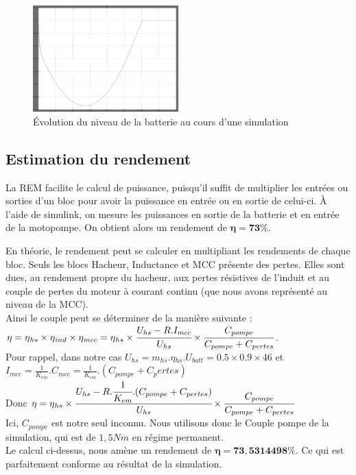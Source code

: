 \begin{figure}[ht]
	\begin{center}
	\includegraphics[width=0.5\textwidth]{images/Niveau_batt_inv.png}
	\caption{Évolution du niveau de la batterie au cours d'une simulation}\label{img:NivBatt}
	\end{center}
\end{figure}
\FloatBarrier 


\subsection{Estimation du rendement}
La REM facilite le calcul de puissance, puisqu'il suffit de multiplier les entrées ou sorties d'un bloc pour avoir la puissance en entrée ou en  sortie de celui-ci. À l'aide de simulink, on mesure les puissances en sortie de la batterie et en entrée de la motopompe. On obtient alors un rendement de $\mathbf{\eta = 73 \%}$.

En théorie, le rendement peut se calculer en multipliant les rendements de chaque bloc. Seuls les blocs Hacheur, Inductance et MCC présente des pertes. Elles sont dues, au rendement propre du hacheur, aux pertes résistives de l'induit et au couple de pertes du moteur à courant continu (que nous avons représenté au niveau de la MCC).\\
Ainsi le couple peut se déterminer de la manière suivante : \\
$\eta = \eta{}_{hs} \times \eta{}_{ind} \times \eta{}_{mcc} = \eta{}_{hs} \times \cfrac{U_{hs}-R.I_{mcc}}{U_{hs}} \times \cfrac{C_{pompe}}{C_{pompe}+C_{pertes}}$.\\
Pour rappel, dans notre cas $ U_{hs} = m_{hs}.\eta{}_{hs}.U_{batt} = 0.5\times0.9\times46 $ et $ I_{mcc} = \frac{1}{K_{em}}.C_{mcc} = \frac{1}{K_{em}}.(C_{pompe}+C_pertes)$\\
Donc $\eta = \eta{}_{hs} \times \cfrac{U_{hs}-R.\cfrac{1}{K_{em}}.(C_{pompe}+C_{pertes})}{U_{hs}} \times \cfrac{C_{pompe}}{C_{pompe}+C_{pertes}}$\\

Ici, $C_{pompe}$ est notre seul inconnu. Nous utilisons donc le Couple pompe de la simulation, qui est de $1,5Nm$ en régime permanent.\\
Le calcul ci-dessus, nous amène un rendement de $\mathbf{\eta = 73,5314498 \%}$. Ce qui est parfaitement conforme au résultat de la simulation.\\